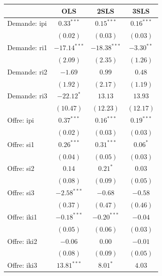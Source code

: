 \documentclass[11pt,]{article}
\begin{document}
\begin{table}[!htbp]
\begin{center}
\begin{tabular}{l c c c }
\hline
 & OLS & 2SLS & 3SLS \\
\hline
Demande: ipi        & $0.33^{***}$   & $0.15^{***}$   & $0.16^{***}$ \\
                    & $(0.02)$       & $(0.03)$       & $(0.03)$     \\
Demande: ri1        & $-17.14^{***}$ & $-18.38^{***}$ & $-3.30^{**}$ \\
                    & $(2.09)$       & $(2.35)$       & $(1.26)$     \\
Demande: ri2        & $-1.69$        & $0.99$         & $0.48$       \\
                    & $(1.92)$       & $(2.17)$       & $(1.19)$     \\
Demande: ri3        & $-22.12^{*}$   & $13.13$        & $13.93$      \\
                    & $(10.47)$      & $(12.23)$      & $(12.17)$    \\
Offre: ipi          & $0.37^{***}$   & $0.16^{***}$   & $0.19^{***}$ \\
                    & $(0.02)$       & $(0.03)$       & $(0.03)$     \\
Offre: si1          & $0.26^{***}$   & $0.31^{***}$   & $0.06^{*}$   \\
                    & $(0.04)$       & $(0.05)$       & $(0.03)$     \\
Offre: si2          & $0.14$         & $0.21^{*}$     & $0.03$       \\
                    & $(0.08)$       & $(0.09)$       & $(0.05)$     \\
Offre: si3          & $-2.58^{***}$  & $-0.68$        & $-0.58$      \\
                    & $(0.37)$       & $(0.47)$       & $(0.46)$     \\
Offre: iki1         & $-0.18^{***}$  & $-0.20^{***}$  & $-0.04$      \\
                    & $(0.05)$       & $(0.06)$       & $(0.03)$     \\
Offre: iki2         & $-0.06$        & $0.00$         & $-0.01$      \\
                    & $(0.08)$       & $(0.09)$       & $(0.05)$     \\
Offre: iki3         & $13.81^{***}$  & $8.01^{*}$     & $4.03$       \\

\end{tabular}
\end{center}
\end{table}
\end{document}

